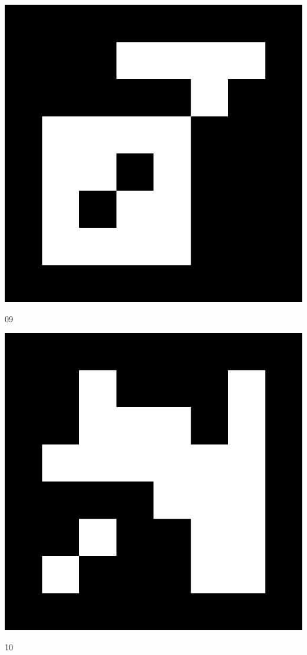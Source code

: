 \newpage
\myemptypage
\vspace{5cm}
\begin{center}
\includegraphics[width=\textwidth, keepaspectratio]{aruco_09.png}
\caption{09}
\end{center}
\newpage
\myemptypage
\vspace{5cm}
\begin{center}
\includegraphics[width=\textwidth, keepaspectratio]{aruco_10.png}
\caption{10}
\end{center}

